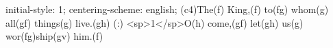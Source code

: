 initial-style: 1;
centering-scheme: english;
(c4)The(f) King,(f) to(fg) whom(g) all(gf) things(g) live.(gh) (:) <sp>1</sp>O(h) come,(gf) let(gh) us(g) wor(fg)ship(gv) him.(f)
